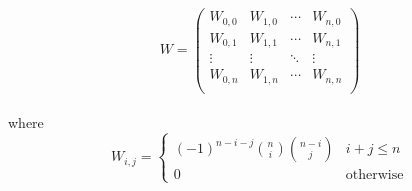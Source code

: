 \begin{equation*}
    W=
    \left(
    \begin{array}{cccc}
        W_{0,0} & W_{1,0} & \cdots & W_{n,0} \\
        W_{0,1} & W_{1,1} & \cdots & W_{n,1} \\
        \vdots  & \vdots  & \ddots & \vdots  \\
        W_{0,n} & W_{1,n} & \cdots & W_{n,n} \\
    \end{array}
    \right)
\end{equation*}
\\
where
\\
\begin{equation*}
    W_{i,j}=\begin{cases}
        (-1)^{n-i-j} {n \choose i}{n-i \choose j} & i + j \le n      \\
        0                                         & \text{otherwise}
    \end{cases}
\end{equation*}